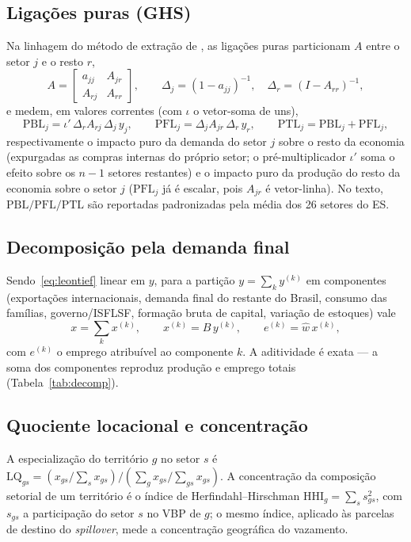 \documentclass[11pt,a4paper]{article}
\begin{document}
\subsection{Ligações puras (GHS)}
\label{ap:puras}
Na linhagem do método de extração de \citet{cella1984}, as ligações puras
\citep{guilhoto2005linkages} particionam $A$ entre o setor $j$ e o resto $r$,
\begin{equation}
A=\begin{bmatrix} a_{jj} & A_{jr}\\ A_{rj} & A_{rr}\end{bmatrix},
\qquad \Delta_j=(1-a_{jj})^{-1},\quad \Delta_r=(I-A_{rr})^{-1},
\label{eq:ghs_part}
\end{equation}
e medem, em valores correntes (com $\iota$ o vetor-soma de uns),
\begin{equation}
\mathrm{PBL}_j=\iota'\,\Delta_r A_{rj}\,\Delta_j\,y_j,
\qquad
\mathrm{PFL}_j=\Delta_j A_{jr}\,\Delta_r\,y_r,
\qquad
\mathrm{PTL}_j=\mathrm{PBL}_j+\mathrm{PFL}_j,
\label{eq:ghs}
\end{equation}
respectivamente o impacto puro da demanda do setor $j$ sobre o resto da economia
(expurgadas as compras internas do próprio setor; o pré-multiplicador $\iota'$ soma o
efeito sobre os $n-1$ setores restantes) e o impacto puro da produção do resto da
economia sobre o setor $j$ ($\mathrm{PFL}_j$ já é escalar, pois $A_{jr}$ é vetor-linha). No texto, $\mathrm{PBL}/\mathrm{PFL}/\mathrm{PTL}$ são
reportadas padronizadas pela média dos 26 setores do ES.

\subsection{Decomposição pela demanda final}
\label{ap:fd}
Sendo~\eqref{eq:leontief} linear em $y$, para a partição $y=\sum_k y^{(k)}$ em componentes
(exportações internacionais, demanda final do restante do Brasil, consumo das famílias,
governo/ISFLSF, formação bruta de capital, variação de estoques) vale
\begin{equation}
x=\sum_k x^{(k)},\qquad x^{(k)}=B\,y^{(k)},\qquad e^{(k)}=\hat{w}\,x^{(k)},
\label{eq:fd}
\end{equation}
com $e^{(k)}$ o emprego atribuível ao componente $k$. A aditividade é exata --- a soma dos
componentes reproduz produção e emprego totais (Tabela~\ref{tab:decomp}).

\subsection{Quociente locacional e concentração}
\label{ap:lq}
A especialização do território $g$ no setor $s$ é
$\mathrm{LQ}_{gs}=(x_{gs}/\sum_s x_{gs})\big/(\sum_g x_{gs}/\sum_{gs}x_{gs})$. A
concentração da composição setorial de um território é o índice de Herfindahl--Hirschman
$\mathrm{HHI}_g=\sum_s s_{gs}^2$, com $s_{gs}$ a participação do setor $s$ no VBP de $g$;
o mesmo índice, aplicado às parcelas de destino do \emph{spillover}, mede a concentração
geográfica do vazamento.
\end{document}
